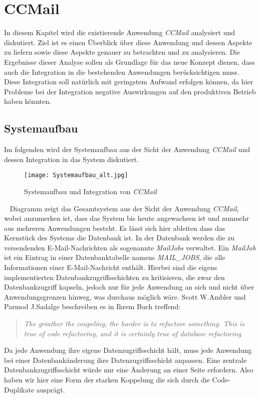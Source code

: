 \chapter{CCMail}
\label{cha:ccmail}
In diesem Kapitel wird die existierende Anwendung \emph{CCMail} analysiert und diskutiert. Ziel ist es einen Überblick über diese Anwendung und dessen Aspekte zu liefern sowie diese Aspekte genauer zu betrachten und zu analysieren. Die Ergebnisse dieser Analyse sollen als Grundlage für das neue Konzept dienen, dass auch die Integration in die bestehenden Anwendungen berücksichtigen muss. Diese Integration soll natürlich mit geringstem Aufwand erfolgen können, da hier Probleme bei der Integration negative Auswirkungen auf den produktiven Betrieb haben könnten. 

\section{Systemaufbau}
\label{sec:ccmail-systemaufbau}
Im folgenden wird der Systemaufbau aus der Sicht der Anwendung \emph{CCMail} und dessen Integration in das System diskutiert. 
\begin{figure}[h]
\centering
\texttt{[image: Systemaufbau\_alt.jpg]} %
\caption{Systemaufbau und Integration von \emph{CCMail}}
\label{fig:ccmail-system-und-integration}
\end{figure}
\ \newpage
{} Diagramm zeigt das Gesamtsystem aus der Sicht der Anwendung \emph{CCMail}, wobei anzumerken ist, dass das System bis heute angewachsen ist und nunmehr aus mehreren Anwendungen besteht. Es lässt sich hier ableiten dass das Kernstück des Systems die Datenbank ist. In der Datenbank werden die zu versendenden E-Mail-Nachrichten als sogenannte \emph{MailJobs} verwaltet. Ein \emph{MailJob} ist ein Eintrag in einer Datenbanktabelle namens \emph{MAIL\_JOBS}, die alle Informationen einer E-Mail-Nachricht enthält. Hierbei sind die eigens implementierten Datenbankzugriffsschichten zu kritisieren, die zwar den Datenbankzugriff kapseln, jedoch nur für jede Anwendung an sich und nicht über Anwendungsgrenzen hinweg, was durchaus möglich wäre. Scott W.Ambler und Parmod J.Sadalge beschreiben es in Ihrem Buch \cite[27]{refactoreDatabase} treffend:
\begin{quote}
\emph{The greather the coupeling, the harder is to refactore something. This is true of code refactoring, and it is certainly true of database refactoring}
\end{quote}
Da jede Anwendung ihre eigene Datenzugriffsschicht hält, muss jede Anwendung bei einer Datenbankänderung ihre Datenzugriffsschicht anpassen. Eine zentrale Datenbankzugriffsschicht würde nur eine Änderung an einer Seite erfordern. Also haben wir hier eine Form der starken Koppelung die sich durch die Code-Duplikate ausprägt.
